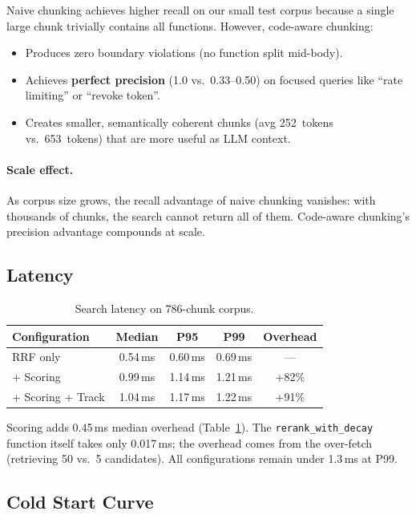 \documentclass[11pt,a4paper]{article}
\begin{document}
Naive chunking achieves higher recall on our small test corpus
because a single large chunk trivially contains all functions.
However, code-aware chunking:

\begin{itemize}
  \item Produces zero boundary violations (no function split mid-body).
  \item Achieves \textbf{perfect precision} (1.0 vs.\ 0.33--0.50) on
    focused queries like ``rate limiting'' or ``revoke token''.
  \item Creates smaller, semantically coherent chunks (avg 252~tokens
    vs.\ 653~tokens) that are more useful as LLM context.
\end{itemize}

\paragraph{Scale effect.}  As corpus size grows, the recall advantage
of naive chunking vanishes: with thousands of chunks, the search
cannot return all of them.  Code-aware chunking's precision advantage
compounds at scale.

\subsection{Latency}

\begin{table}[t]
  \centering
  \caption{Search latency on 786-chunk corpus.}
  \label{tab:latency}
  \begin{tabular}{lcccc}
    \toprule
    Configuration & Median & P95 & P99 & Overhead \\
    \midrule
    RRF only          & 0.54\,ms & 0.60\,ms & 0.69\,ms & --- \\
    + Scoring         & 0.99\,ms & 1.14\,ms & 1.21\,ms & +82\% \\
    + Scoring + Track & 1.04\,ms & 1.17\,ms & 1.22\,ms & +91\% \\
    \bottomrule
  \end{tabular}
\end{table}

Scoring adds 0.45\,ms median overhead (Table~\ref{tab:latency}).
The \texttt{rerank\_with\_decay} function itself takes only 0.017\,ms;
the overhead comes from the over-fetch (retrieving 50 vs.\ 5
candidates).  All configurations remain under 1.3\,ms at P99.


\subsection{Cold Start Curve}
\label{sec:coldstart}
\end{document}
